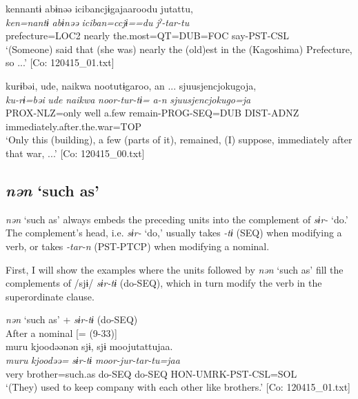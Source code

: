  \ex  %
      \glll    {\textbar}ken{\textbar}nantɨ  abɨnəə  {\textbar}iciban{\textbar}cjɨgajaaroodu  jutattu,\\
      \textit{ken=nantɨ}  \textit{abɨnəə}  \textit{iciban=ccjɨ==du}  \textit{jˀ-tar-tu}\\
      prefecture=LOC2  nearly  the.most=QT=DUB=FOC  say-PST-CSL\\
      \glt       ‘(Someone) said that (she was) nearly the (old)est in the (Kagoshima) Prefecture, so ...’ [Co: 120415\_01.txt]

  \ex  %
      \glll    kurɨbəi,  ude,  naikwa  nootutɨgaroo,  an ...  {\textbar}sjuusjencjokugo{\textbar}ja,\\
      \textit{ku-rɨ=bəi}  \textit{ude}  \textit{naikwa}  \textit{noor-tur-tɨ=}  \textit{a-n}  \textit{sjuusjencjokugo=ja}  \\
      PROX-NLZ=only  well  a.few  remain-PROG-SEQ=DUB  DIST-ADNZ  immediately.after.the.war=TOP        \\
      \glt       ‘Only this (building), a few (parts of it), remained, (I) suppose, immediately after that war, ...’ [Co: 120415\_00.txt]
    \z
\z

\subsection{\textit{nən} ‘such as’}\label{sec:10.4.4}

\textit{nən} ‘such as’ always embeds the preceding units into the complement of \textit{sɨr-} ‘do.’ The complement’s head, i.e. \textit{sɨr-} ‘do,’ usually takes \textit{{}-tɨ} (SEQ) when modifying a verb, or takes \textit{-tar-n} (PST-PTCP) when modifying a nominal.

  First, I will show the examples where the units followed by \textit{nən} ‘such as’ fill the complements of /sjɨ/ \textit{sɨr-tɨ} (do-SEQ), which in turn modify the verb in the superordinate clause.

\ea\label{ex:10.85}   \textit{nən} ‘such as’ + \textit{sɨr-tɨ} (do-SEQ)\\
  \ea After a nominal [= (9-33)]\\
      \glll    muru  kjoodəənən  sjɨ,  sjɨ  moojutattujaa.\\
    \textit{muru}  \textit{kjoodəə=}  \textit{}  \textit{sɨr-tɨ}  \textit{moor-jur-tar-tu=jaa}\\
    very  brother=such.as  do-SEQ  do-SEQ  HON-UMRK-PST-CSL=SOL\\
\glt     ‘(They) used to keep company with each other like brothers.’  [Co: 120415\_01.txt]

